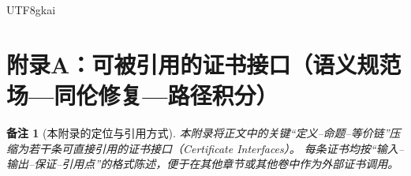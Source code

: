 \documentclass[12pt]{article}
\newtheorem{remark}{备注}[section]
\begin{document}
\begin{CJK*}{UTF8}{gkai}
\renewcommand{\refname}{\texorpdfstring{参考文献}{References}}

\clearpage

\appendix
\section{附录A：可被引用的证书接口（语义规范场—同伦修复—路径积分）}
\label{app:tex20-certificate-interfaces}

\begin{remark}[本附录的定位与引用方式]
本附录将正文中的关键“定义--命题--等价链”压缩为若干条可直接引用的\emph{证书接口}（Certificate Interfaces）。
每条证书均按“输入--输出--保证--引用点”的格式陈述，便于在其他章节或其他卷中作为外部证书调用。
\end{remark}


\end{CJK*}
\end{document}
